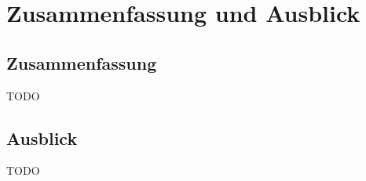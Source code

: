 \chapter{Zusammenfassung und Ausblick}

%
%
%
\section{Zusammenfassung}
TODO

%
%
%
\section{Ausblick}
TODO


